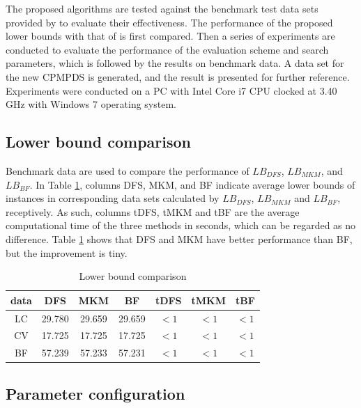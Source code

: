 \documentclass[review,3p,times,authoryear,12pt]{elsarticle}
\begin{document}
The proposed algorithms are tested against the benchmark test data sets provided by \cite{BF2012} to evaluate their effectiveness.
The performance of the proposed lower bounds with that of \cite{BF2012} is first compared. Then a series of experiments are conducted to evaluate the performance of the evaluation scheme and search parameters, which is followed by the results on benchmark data.
A data set for the new CPMPDS is generated, and the result is presented for further reference. 
Experiments were conducted on a PC with Intel Core i7 CPU clocked at 3.40 GHz with Windows 7 operating system.

\subsection {Lower bound comparison}

Benchmark data are used to compare the performance of $\mathit{LB}_\mathit{DFS}$, $\mathit{LB}_\mathit{MKM}$, and $\mathit{LB}_\mathit{BF}$. 
In Table \ref{tab:lowerbound}, columns DFS, MKM, and BF indicate average lower bounds of instances in corresponding data sets calculated by $\mathit{LB}_\mathit{DFS}$, $\mathit{LB}_\mathit{MKM}$ and $\mathit{LB}_\mathit{BF}$, receptively. 
As such, columns tDFS, tMKM and tBF are the average computational time of the three methods in seconds, which can be regarded as no difference. 
Table \ref{tab:lowerbound} shows that DFS and MKM have better performance than BF, but the improvement is tiny.

\begin{table}[!htb]
\centering
\caption{\label{tab:lowerbound} Lower bound comparison}
\begin{tabular}{c|c|c|c|c|c|c}
    \hline
    data &    DFS     &     MKM   &   BF     & tDFS    & tMKM   & tBF \\
    \hline
    LC       &   29.780   &   29.659  &  29.659  & $<1$    & $<1$   & $<1$ \\
    CV       &   17.725   &   17.725  &  17.725  & $<1$    & $<1$   & $<1$ \\
    BF       &   57.239   &   57.233  &  57.231  & $<1$    & $<1$   & $<1$ \\
    \hline
    \end{tabular}%

\end{table}

\subsection {Parameter configuration}
\label{sub:config}
\end{document}
